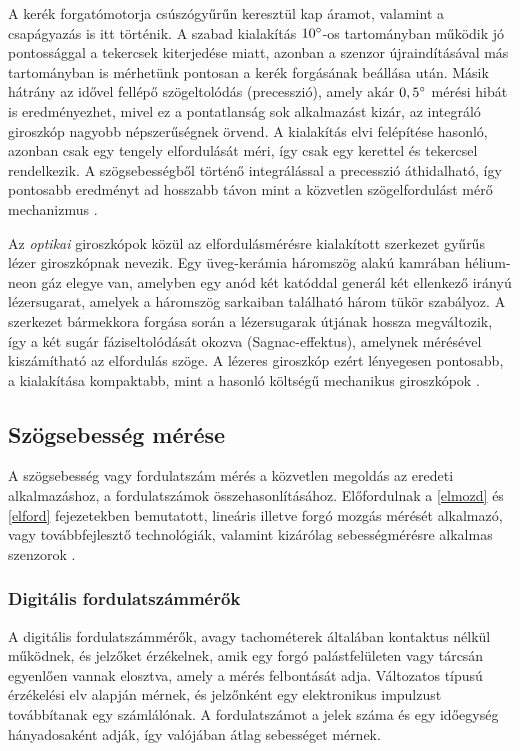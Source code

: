 A kerék forgatómotorja csúszógyűrűn keresztül kap áramot, valamint a csapágyazás is itt történik. A szabad kialakítás $10\degree$-os tartományban működik jó pontossággal a tekercsek kiterjedése miatt, azonban a szenzor újraindításával más tartományban is mérhetünk pontosan a kerék forgásának beállása után. Másik hátrány az idővel fellépő szögeltolódás (precesszió), amely akár $0,5\degree$ mérési hibát is eredményezhet, mivel ez a pontatlanság sok alkalmazást kizár, az integráló giroszkóp nagyobb népszerűségnek örvend. A kialakítás elvi felépítése hasonló, azonban csak egy tengely elfordulását méri, így csak egy kerettel és tekercsel rendelkezik. A szögsebességből történő integrálással a precesszió áthidalható, így pontosabb eredményt ad hosszabb távon mint a közvetlen szögelfordulást mérő mechanizmus \cite{Morris2016b}.

Az \textit{optikai} giroszkópok közül az elfordulásmérésre kialakított szerkezet gyűrűs lézer giroszkópnak nevezik. Egy üveg-kerámia háromszög alakú kamrában hélium-neon gáz elegye van, amelyben egy anód két katóddal generál két ellenkező irányú lézersugarat, amelyek a háromszög sarkaiban található három tükör szabályoz. A szerkezet bármekkora forgása során a lézersugarak útjának hossza megváltozik, így a két sugár fáziseltolódását okozva (Sagnac-effektus), amelynek mérésével kiszámítható az elfordulás szöge. A lézeres giroszkóp ezért lényegesen pontosabb, a kialakítása kompaktabb, mint a hasonló költségű mechanikus giroszkópok \cite{Morris2016b}.

\subsection{Szögsebesség mérése}

A szögsebesség vagy fordulatszám mérés a közvetlen megoldás az eredeti alkalmazáshoz, a fordulatszámok összehasonlításához. Előfordulnak a \ref{elmozd} és \ref{elford} fejezetekben bemutatott, lineáris illetve forgó mozgás mérését alkalmazó, vagy továbbfejlesztő technológiák, valamint kizárólag sebességmérésre alkalmas szenzorok \cite{Morris2016b}.

\subsubsection{Digitális fordulatszámmérők}

A digitális fordulatszámmérők, avagy tachométerek általában kontaktus nélkül működnek, és jelzőket érzékelnek, amik egy forgó palástfelületen vagy tárcsán egyenlően vannak elosztva, amely a mérés felbontását adja. Változatos típusú érzékelési elv alapján mérnek, és jelzőnként egy elektronikus impulzust továbbítanak egy számlálónak. A fordulatszámot a jelek száma és egy időegység hányadosaként adják, így valójában átlag sebességet mérnek. 

